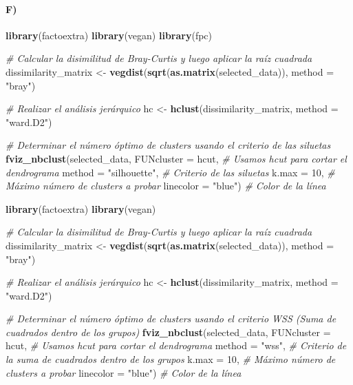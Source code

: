 \documentclass[
]{article}
\newenvironment{Shaded}{\begin{snugshade}}{\end{snugshade}}
\newcommand{\AttributeTok}[1]{\textcolor[rgb]{0.13,0.29,0.53}{#1}}
\newcommand{\CommentTok}[1]{\textcolor[rgb]{0.56,0.35,0.01}{\textit{#1}}}
\newcommand{\DecValTok}[1]{\textcolor[rgb]{0.00,0.00,0.81}{#1}}
\newcommand{\FunctionTok}[1]{\textcolor[rgb]{0.13,0.29,0.53}{\textbf{#1}}}
\newcommand{\NormalTok}[1]{#1}
\newcommand{\OtherTok}[1]{\textcolor[rgb]{0.56,0.35,0.01}{#1}}
\newcommand{\StringTok}[1]{\textcolor[rgb]{0.31,0.60,0.02}{#1}}
\begin{document}
\hypertarget{f-3}{%
\paragraph{F)}\label{f-3}}

\begin{Shaded}
\begin{Highlighting}[]
\FunctionTok{library}\NormalTok{(factoextra)}
\FunctionTok{library}\NormalTok{(vegan)}
\FunctionTok{library}\NormalTok{(fpc)}

\CommentTok{\# Calcular la disimilitud de Bray{-}Curtis y luego aplicar la raíz cuadrada}
\NormalTok{dissimilarity\_matrix }\OtherTok{\textless{}{-}} \FunctionTok{vegdist}\NormalTok{(}\FunctionTok{sqrt}\NormalTok{(}\FunctionTok{as.matrix}\NormalTok{(selected\_data)), }\AttributeTok{method =} \StringTok{"bray"}\NormalTok{)}

\CommentTok{\# Realizar el análisis jerárquico}
\NormalTok{hc }\OtherTok{\textless{}{-}} \FunctionTok{hclust}\NormalTok{(dissimilarity\_matrix, }\AttributeTok{method =} \StringTok{"ward.D2"}\NormalTok{)}

\CommentTok{\# Determinar el número óptimo de clusters usando el criterio de las siluetas}
\FunctionTok{fviz\_nbclust}\NormalTok{(selected\_data, }
             \AttributeTok{FUNcluster =}\NormalTok{ hcut,           }\CommentTok{\# Usamos hcut para cortar el dendrograma}
             \AttributeTok{method =} \StringTok{"silhouette"}\NormalTok{,       }\CommentTok{\# Criterio de las siluetas}
             \AttributeTok{k.max =} \DecValTok{10}\NormalTok{,                 }\CommentTok{\# Máximo número de clusters a probar}
             \AttributeTok{linecolor =} \StringTok{"blue"}\NormalTok{)         }\CommentTok{\# Color de la línea}

\FunctionTok{library}\NormalTok{(factoextra)}
\FunctionTok{library}\NormalTok{(vegan)}

\CommentTok{\# Calcular la disimilitud de Bray{-}Curtis y luego aplicar la raíz cuadrada}
\NormalTok{dissimilarity\_matrix }\OtherTok{\textless{}{-}} \FunctionTok{vegdist}\NormalTok{(}\FunctionTok{sqrt}\NormalTok{(}\FunctionTok{as.matrix}\NormalTok{(selected\_data)), }\AttributeTok{method =} \StringTok{"bray"}\NormalTok{)}

\CommentTok{\# Realizar el análisis jerárquico}
\NormalTok{hc }\OtherTok{\textless{}{-}} \FunctionTok{hclust}\NormalTok{(dissimilarity\_matrix, }\AttributeTok{method =} \StringTok{"ward.D2"}\NormalTok{)}

\CommentTok{\# Determinar el número óptimo de clusters usando el criterio WSS (Suma de cuadrados dentro de los grupos)}
\FunctionTok{fviz\_nbclust}\NormalTok{(selected\_data, }
             \AttributeTok{FUNcluster =}\NormalTok{ hcut,           }\CommentTok{\# Usamos hcut para cortar el dendrograma}
             \AttributeTok{method =} \StringTok{"wss"}\NormalTok{,              }\CommentTok{\# Criterio de la suma de cuadrados dentro de los grupos}
             \AttributeTok{k.max =} \DecValTok{10}\NormalTok{,                 }\CommentTok{\# Máximo número de clusters a probar}
             \AttributeTok{linecolor =} \StringTok{"blue"}\NormalTok{)         }\CommentTok{\# Color de la línea}


\end{Highlighting}
\end{Shaded}
\end{document}
